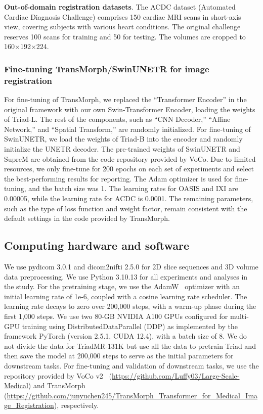 \textbf{Out-of-domain registration datasets}. The ACDC dataset \citep{bernard2018deep} (Automated Cardiac Diagnosis Challenge) comprises 150 cardiac MRI scans in short-axis view, covering subjects with various heart conditions. The original challenge reserves 100 scans for training and 50 for testing. The volumes are cropped to 160×192×224. 

\subsubsection{Fine-tuning TransMorph/SwinUNETR for image registration}

For fine-tuning of TransMorph, we replaced the ``Transformer Encoder'' in the original framework with our own Swin-Transformer Encoder, loading the weights of Triad-L. The rest of the components, such as ``CNN Decoder,'' ``Affine Network,'' and ``Spatial Transform,'' are randomly initialized.
For fine-tuning of SwinUNETR, we load the weights of Triad-B into the encoder and randomly initialize the UNETR decoder. The pre-trained weights of SwinUNETR and SupreM are obtained from the code repository provided by VoCo.
Due to limited resources, we only fine-tune for 200 epochs on each set of experiments and select the best-performing results for reporting. The Adam optimizer is used for fine-tuning, and the batch size was 1. The learning rates for OASIS and IXI are 0.00005, while the learning rate for ACDC is 0.0001.
The remaining parameters, such as the type of loss function and weight factor, remain consistent with the default settings in the code provided by TransMorph.

\subsection{Computing hardware and software}
\label{sec:code}
We use pydicom 3.0.1 and dicom2nifti 2.5.0 for 2D slice sequences and 3D volume data preprocessing. We use Python 3.10.13 for all experiments and analyses in the study.
For the pretraining stage, we use the AdamW~\cite{loshchilov2017decoupled} optimizer with an initial learning rate of 1e-6, coupled with a cosine learning rate scheduler. The learning rate decays to zero over 200,000 steps, with a warm-up phase during the first 1,000 steps.
We use two 80-GB NVIDIA A100 GPUs configured for multi-GPU training using DistributedDataParallel (DDP) as implemented by the framework PyTorch (version 2.5.1, CUDA 12.4), with a batch size of 8. We do not divide the data for TriadMR-131K but use all the data to pretrain Triad and then save the model at 200,000 steps to serve as the initial parameters for downstream tasks.
For fine-tuning and validation of downstream tasks, we use the repository provided by VoCo v2~\cite{wu2024voco,wu2024large} (\url{https://github.com/Luffy03/Large-Scale-Medical}) and TransMorph~\cite{chen2022transmorph} (\url{https://github.com/junyuchen245/TransMorph_Transformer_for_Medical_Image_Registration}), respectively.

